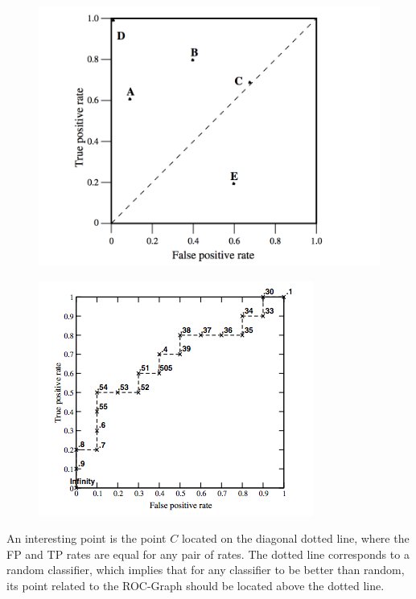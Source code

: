 \begin{figure}
\centering
\begin{minipage}{.5\textwidth}
  \centering
  \includegraphics[scale=0.47]{Graphics/roc-graph.png}
  \label{fig:roc-graph}
\end{minipage}%
\begin{minipage}{.5\textwidth}
  \centering
    \includegraphics[scale=0.57]{Graphics/roc-curve.png}
  \label{fig:roc-curve}
\end{minipage}
\end{figure}


An interesting point is the point \(C\) located on the diagonal dotted line, where the FP and TP rates are equal for any pair of rates. The dotted line corresponds to a random classifier, which implies that for any classifier to be better than random, its point related to the ROC-Graph should be located above the dotted line.

